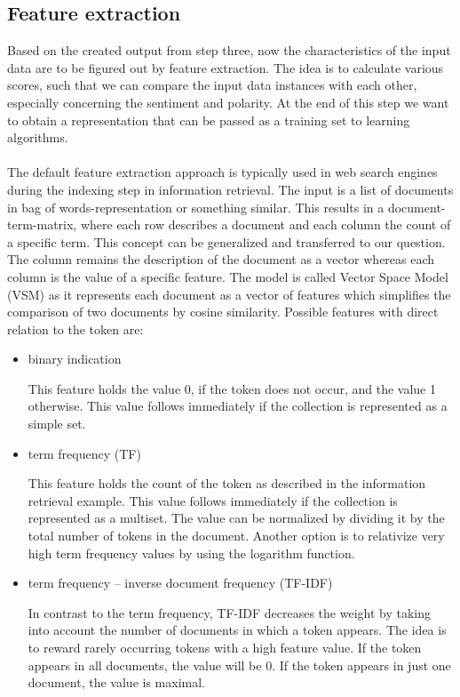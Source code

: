 \documentclass[article,type=msc,colorback,accentcolor=tud7b]{tudthesis}
\begin{document}
  \subsection{Feature extraction}
    Based on the created output from step three, now the characteristics of the input data are to be figured out by feature extraction. The idea is to calculate various scores, such that we can compare the input data instances with each other, especially concerning the sentiment and polarity. At the end of this step we want to obtain a representation that can be passed as a training set to learning algorithms. \\\\
    The default feature extraction approach is typically used in web search engines during the indexing step in information retrieval. The input is a list of documents in bag of words-representation or something similar. This results in a document-term-matrix, where each row describes a document and each column the count of a specific term. This concept can be generalized and transferred to our question. The column remains the description of the document as a vector whereas each column is the value of a specific feature. The model is called Vector Space Model (VSM) as it represents each document as a vector of features which simplifies the comparison of two documents by cosine similarity. Possible features with direct relation to the token are:
    \begin{itemize}
      \item binary indication
      
        This feature holds the value 0, if the token does not occur, and the value 1 otherwise. This value follows immediately if the collection is represented as a simple set.
      \item term frequency (TF)
      
        This feature holds the count of the token as described in the information retrieval example. This value follows immediately if the collection is represented as a multiset. The value can be normalized by dividing it by the total number of tokens in the document. Another option is to relativize very high term frequency values by using the logarithm function.
      \item term frequency – inverse document frequency (TF-IDF)
      
        In contrast to the term frequency, TF-IDF decreases the weight by taking into account the number of documents in which a token appears. The idea is to reward rarely occurring tokens with a high feature value. If the token appears in all documents, the value will be 0. If the token appears in just one document, the value is maximal.
    \end{itemize}
\end{document}

